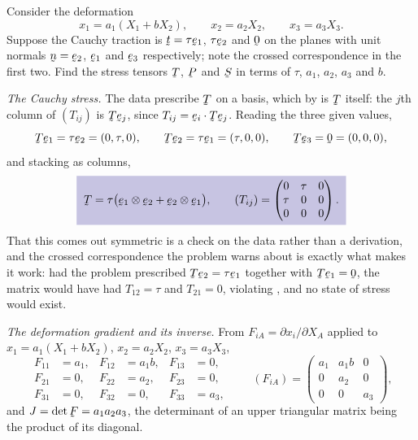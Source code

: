 \begin{problem}
Consider the deformation
\[
   x_{1}=a_{1}(X_{1}+bX_{2}),\qquad x_{2}=a_{2}X_{2},\qquad
   x_{3}=a_{3}X_{3} .
\]
Suppose the Cauchy traction is $\bt=\tau\be_{1}$, $\tau\be_{2}$ and
$\bze$ on the planes with unit normals $\bn=\be_{2}$, $\be_{1}$ and
$\be_{3}$ respectively; note the crossed correspondence in the first
two. Find the stress tensors $\bT$, $\bP$ and $\bS$ in terms of $\tau$,
$a_{1}$, $a_{2}$, $a_{3}$ and $b$.
\end{problem}

\begin{solution}
\noindent\emph{The Cauchy stress.}
The data prescribe $\bT$ on a basis, which by  is $\bT$
itself: the $j$th column of $(T_{ij})$ is $\bT\be_{j}$, since
$T_{ij}=\ip{\be_{i}}{\bT\be_{j}}$. Reading the three given values,
\[
   \bT\be_{1}=\tau\be_{2}=(0,\tau,0),
   \qquad
   \bT\be_{2}=\tau\be_{1}=(\tau,0,0),
   \qquad
   \bT\be_{3}=\bze=(0,0,0),
\]
and stacking as columns,
\[
   \boxed{\;\bT=\tau\big(\be_{1}\otimes\be_{2}
   +\be_{2}\otimes\be_{1}\big),\qquad
   (T_{ij})=\begin{pmatrix}0&\tau&0\\ \tau&0&0\\ 0&0&0\end{pmatrix}.\;}
\]
That this comes out symmetric is a check on the data rather than a
derivation, and the crossed correspondence the problem warns about is
exactly what makes it work: had the problem prescribed
$\bT\be_{2}=\tau\be_{1}$ together with $\bT\be_{1}=\bze$, the matrix
would have had $T_{12}=\tau$ and $T_{21}=0$, violating , and
no state of stress would exist.

\medskip
\noindent\emph{The deformation gradient and its inverse.}
From $F_{iA}=\partial x_{i}/\partial X_{A}$ applied to
$x_{1}=a_{1}(X_{1}+bX_{2})$, $x_{2}=a_{2}X_{2}$, $x_{3}=a_{3}X_{3}$,
\[
\begin{aligned}
   F_{11}&=a_{1}, & F_{12}&=a_{1}b, & F_{13}&=0,\\
   F_{21}&=0, & F_{22}&=a_{2}, & F_{23}&=0,\\
   F_{31}&=0, & F_{32}&=0, & F_{33}&=a_{3},
\end{aligned}
\qquad
   (F_{iA})=\begin{pmatrix}a_{1}&a_{1}b&0\\ 0&a_{2}&0\\
   0&0&a_{3}\end{pmatrix},
\]
and $J=\det\bF=a_{1}a_{2}a_{3}$, the determinant of an upper
triangular matrix being the product of its diagonal.


\end{solution}
